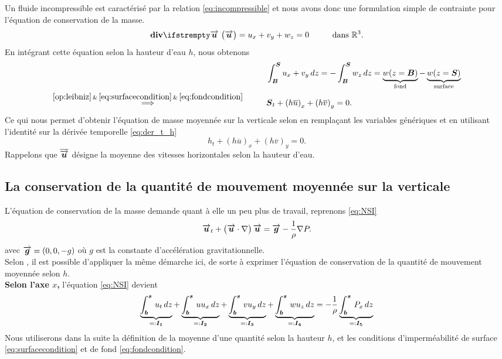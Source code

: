 \noindent Un fluide incompressible est caractérisé par la relation \eqref{eq:incompressible} et nous avons donc une formulation simple de contrainte pour l'équation de conservation de la masse.
\begin{equation}
	\div[\velocity] = u_x + v_y + w_z = 0 \hspace{1cm}\text{dans $\mathbb{R}^3$.}
\end{equation}
En intégrant cette équation selon la hauteur d'eau $h$, nous obtenons
\begin{align}
	 &\int_{\boldsymbol{B}}^{\boldsymbol{S}}u_x + v_y\,dz = - \int_{\boldsymbol{B}}^{\boldsymbol{S}} w_z\,dz = \underbrace{w(z=\boldsymbol{B})}_{\text{fond}} - \underbrace{w(z=\boldsymbol{S})}_{\text{surface}}\\
	 \overset{\eqref{op:leibniz}\,\&\,\eqref{eq:surfacecondition}\,\&\,\eqref{eq:fondcondition}}{\Longrightarrow}\hspace{1cm}& \boldsymbol{S}_t + \left(h\overline{u}\right)_x + \left(h\overline{v}\right)_y = 0.
\end{align}
Ce qui nous permet d'obtenir l'équation de masse moyennée sur la verticale selon \citet{Pons2018} en remplaçant les variables génériques et en utilisant l'identité sur la dérivée temporelle \eqref{eq:der_t_h}
\begin{equation}
	h_t + \left(h\overline{u}\right)_x + \left(h\overline{v}\right)_y= 0.\label{eq:mass_moyennee}
\end{equation}
Rappelons que $\overline{\overrightarrow{\boldsymbol{u}}}$ désigne la moyenne des vitesses horizontales selon la hauteur d'eau.
\subsection{La conservation de la quantité de mouvement moyennée sur la verticale}
\noindent L'équation de conservation de la masse demande quant à elle un peu plus de travail, reprenons \eqref{eq:NSI}
\begin{equation*}
	\overrightarrow{\boldsymbol{u}}_t + \left(\overrightarrow{\boldsymbol{u}}\cdot\nabla\right)\overrightarrow{\boldsymbol{u}} = \overrightarrow{\boldsymbol{g}} -\frac{1}{\rho} \nabla P.
\end{equation*}
avec $\overrightarrow{\boldsymbol{g}} = \left(0, 0, -g\right)$ où $g$ est la constante d'accélération gravitationnelle.\\
Selon \citet{Pons2018}, il est possible d'appliquer la même démarche ici, de sorte à  exprimer l'équation de conservation de la quantité de mouvement moyennée selon $h$. \\

\noindent \textbf{Selon l'axe $x$,} l'équation \eqref{eq:NSI} devient
\begin{equation}
	\underbrace{\int_{\boldsymbol{b}}^{\boldsymbol{s}}\,u_t\,dz}_{=:\boldsymbol{I_1}} + \underbrace{\int_{\boldsymbol{b}}^{\boldsymbol{s}}\,uu_x\,dz}_{=:\boldsymbol{I_2}} + \underbrace{\int_{\boldsymbol{b}}^{\boldsymbol{s}}\,vu_y\,dz}_{=:\boldsymbol{I_3}} + \underbrace{\int_{\boldsymbol{b}}^{\boldsymbol{s}}\,wu_z\,dz}_{=:\boldsymbol{I_4}} = -\frac{1}{\rho}\underbrace{\int_{\boldsymbol{b}}^{\boldsymbol{s}}\,P_x\,dz}_{=:\boldsymbol{I_5}}
\end{equation}
Nous utiliserons dans la suite la définition de la moyenne d'une quantité selon la hauteur $h$, et les conditions d'imperméabilité de surface
\eqref{eq:surfacecondition} et de fond \eqref{eq:fondcondition}.\\

